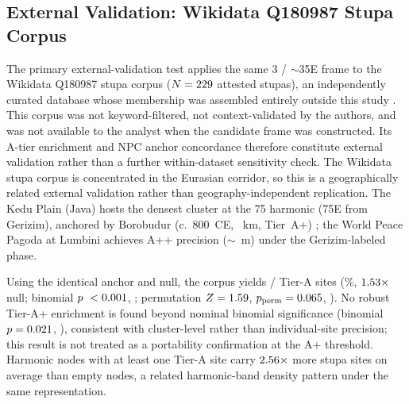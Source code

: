 \subsection{External Validation: Wikidata Q180987 Stupa Corpus}
\label{sec:stupas_q180987}

The primary external-validation test applies the same 3\textdegree{} /
$\sim$35\textdegree{}E frame to the Wikidata Q180987 stupa corpus
($N = 229{}$ attested stupas), an independently curated
database whose membership was assembled entirely outside this study
\citep{tenenbaum2026audit}. This corpus was not keyword-filtered, not
context-validated by the authors, and was not available to the
analyst when the candidate frame was constructed. Its
A-tier enrichment and NPC anchor concordance therefore constitute
external validation rather than a further within-dataset sensitivity
check.
The Wikidata stupa corpus is concentrated in the Eurasian corridor,
so this is a geographically related external validation rather than
geography-independent replication.
The Kedu Plain (Java) hosts the densest cluster at the 75\textdegree{} harmonic (75\textdegree{}E from Gerizim),
anchored by Borobudur (c.\ 800~CE, \wikiStupaBorobudurDevKm~km, Tier~A+)
\citep{miksic1990borobudur}; the World Peace Pagoda at Lumbini achieves
A++ precision ($\sim$\wikiStupaLumbiniDevM~m) under the Gerizim-labeled
phase.

Using the identical anchor and null, the corpus yields
\wikiStupaATierCount/\wikiStupaTotal{} Tier-A sites
(\wikiStupaATierRate\%, $1.53\times$ null;
binomial $p\ < 0.001$, \wikiStupaATierBinomStar;
permutation $Z = 1.59$, $p_\mathrm{perm} = 0.065$,
\wikiStupaPermStar).
No robust Tier-A+ enrichment is found beyond nominal binomial significance
(binomial $p = 0.021$, \wikiStupaApBinomStar{}), consistent with
cluster-level rather than individual-site precision; this result is not
treated as a portability confirmation at the A+ threshold.
Harmonic nodes with at least one Tier-A site carry $2.56\times$
more stupa sites on average than empty nodes, a related harmonic-band
density pattern under the same representation.

